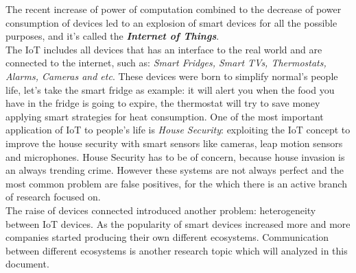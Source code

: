 %
%
%

The recent increase of power of computation combined to the decrease of power
consumption of devices led to an explosion of smart devices for all the possible
purposes, and it's called the \textit{\textbf{Internet of Things}}.\\
The IoT includes all devices that has an interface to the real world
and are connected to the internet, such as: \textit{Smart Fridges, Smart TVs, Thermostats,
Alarms, Cameras and etc}. These devices were born to simplify normal's people life,
let's take the smart fridge as example: it will alert you when the food you have in the
fridge is going to expire, the thermostat will try to save money applying smart
strategies for heat consumption. One of the most important application of IoT
to people's life is \textit{House Security}: exploiting the IoT concept to improve the house
security with smart sensors like cameras, leap motion sensors and microphones.
House Security has to be of concern, because house invasion is an always trending
crime. However these systems are not always perfect and the most common problem are
false positives, for the which there is an active branch of research focused on.\\
The raise of devices connected introduced another problem: heterogeneity between
IoT devices. As the popularity of smart devices increased more and more companies
started producing their own different ecosystems. Communication between different
ecosystems is another research topic which will analyzed in this document.
